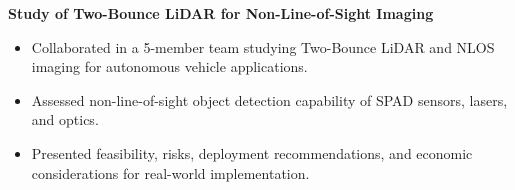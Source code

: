 \documentclass[a4paper,10pt]{article}
\begin{document}
\vspace{2pt}
\noindent \textbf{Study of Two-Bounce LiDAR for Non-Line-of-Sight Imaging}
\begin{itemize}[topsep=1pt]
  \item Collaborated in a 5-member team studying Two-Bounce LiDAR and NLOS imaging for autonomous vehicle applications.
  \item Assessed non-line-of-sight object detection capability of SPAD sensors, lasers, and optics.
  \item Presented feasibility, risks, deployment recommendations, and economic considerations for real-world implementation.
\end{itemize}
\end{document}
